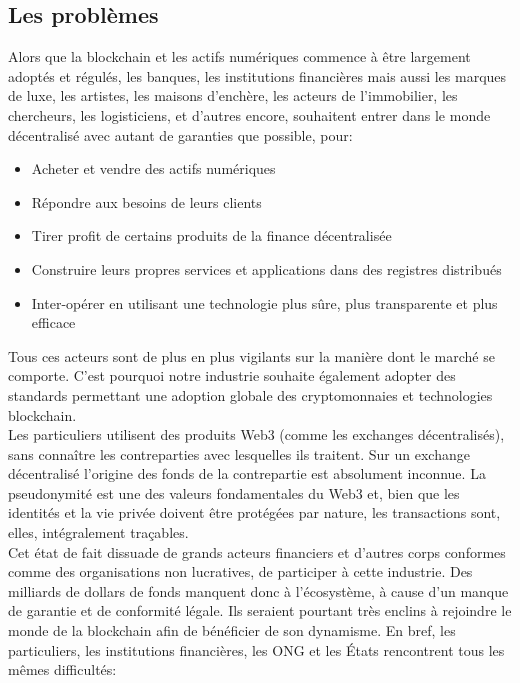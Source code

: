 ﻿\documentclass[a4paper]{article}
\begin{document}
\subsection{Les problèmes}
Alors que la blockchain et les actifs numériques commence à être largement adoptés et régulés, les banques, les institutions financières mais aussi les marques de luxe, les artistes, les maisons d’enchère, les acteurs de l’immobilier, les chercheurs, les logisticiens, et d’autres encore, souhaitent entrer dans le monde décentralisé avec autant de garanties que possible, pour: 

\begin{itemize}
\item Acheter et vendre des actifs numériques
\item Répondre aux besoins de leurs clients
\item Tirer profit de certains produits de la finance décentralisée 
\item Construire leurs propres services et applications dans des registres distribués 
\item Inter-opérer en utilisant une technologie plus sûre, plus transparente et plus efficace
\end{itemize}
Tous ces acteurs sont de plus en plus vigilants sur la manière dont le marché se comporte. C’est pourquoi notre industrie souhaite également adopter des standards permettant une adoption globale des cryptomonnaies et technologies blockchain.  \\

Les particuliers utilisent des produits Web3 (comme les exchanges décentralisés), sans connaître les contreparties avec lesquelles ils traitent. Sur un exchange décentralisé l’origine des fonds de la contrepartie est absolument inconnue. La pseudonymité est une des valeurs fondamentales du Web3 et, bien que les identités et la vie privée doivent être  protégées par nature, les transactions sont, elles, intégralement traçables. \\

Cet état de fait dissuade de grands acteurs financiers et d’autres corps conformes comme des organisations non lucratives, de participer à cette industrie. Des milliards de dollars de fonds manquent donc à l'écosystème, à cause d’un manque de garantie et de conformité légale. Ils seraient pourtant très enclins à rejoindre le monde de la blockchain afin de bénéficier de son dynamisme. En bref, les particuliers, les institutions financières, les ONG et les États rencontrent tous les mêmes difficultés: 
\end{document}
